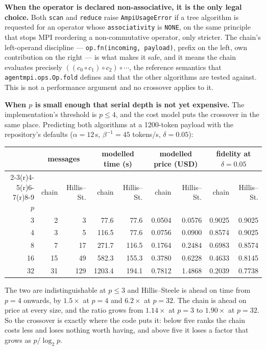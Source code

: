 \documentclass[11pt]{article}
\begin{document}
\textbf{When the operator is declared non-associative, it is the only legal choice.} Both
\texttt{scan} and \texttt{reduce} raise \texttt{AmpiUsageError} if a tree algorithm is requested
for an operator whose \texttt{associativity} is \texttt{NONE}, on the same principle that stops MPI
reordering a non-commutative operator, only stricter. The chain's left-operand discipline ---
\texttt{op.fn(incoming, payload)}, prefix on the left, own contribution on the right --- is what
makes it safe, and it means the chain evaluates precisely
$((c_0 \circ c_1) \circ c_2) \circ \cdots$, the reference semantics that
\texttt{agentmpi.ops.Op.fold} defines and that the other algorithms are tested against. This is
not a performance argument and no crossover applies to it.

\textbf{When $p$ is small enough that serial depth is not yet expensive.} The implementation's
threshold is $p \le 4$, and the cost model puts the crossover in the same place. Predicting both
algorithms at a 1200-token payload with the repository's defaults ($\alpha = 12$\,s,
$\beta^{-1} = 45$ tokens/s, $\delta = 0.05$):

\begin{center}\footnotesize
\begin{tabular}{@{}rrrrrrrrr@{}}
\toprule
  & \multicolumn{2}{c}{messages} & \multicolumn{2}{c}{modelled time (s)} & \multicolumn{2}{c}{modelled price (USD)} & \multicolumn{2}{c}{fidelity at $\delta=0.05$} \\
  \cmidrule(r){2-3}\cmidrule(r){4-5}\cmidrule(r){6-7}\cmidrule(r){8-9}
  $p$ & chain & Hillis--St. & chain & Hillis--St. & chain & Hillis--St. & chain & Hillis--St. \\
\midrule
  3  & 2  & 3   & 77.6   & 77.6  & 0.0504 & 0.0576 & 0.9025 & 0.9025 \\
  4  & 3  & 5   & 116.5  & 77.6  & 0.0756 & 0.0900 & 0.8574 & 0.9025 \\
  8  & 7  & 17  & 271.7  & 116.5 & 0.1764 & 0.2484 & 0.6983 & 0.8574 \\
  16 & 15 & 49  & 582.3  & 155.3 & 0.3780 & 0.6228 & 0.4633 & 0.8145 \\
  32 & 31 & 129 & 1203.4 & 194.1 & 0.7812 & 1.4868 & 0.2039 & 0.7738 \\
\bottomrule
\end{tabular}\normalsize
\end{center}

\noindent
The two are indistinguishable at $p \le 3$ and Hillis--Steele is ahead on time from $p=4$ onwards,
by $1.5\times$ at $p=4$ and $6.2\times$ at $p=32$. The chain is ahead on price at every size, and
the ratio grows from $1.14\times$ at $p=3$ to $1.90\times$ at $p=32$. So the crossover is exactly
where the code puts it: below five ranks the chain costs less and loses nothing worth having, and
above five it loses a factor that grows as $p/\log_2 p$.
\end{document}
